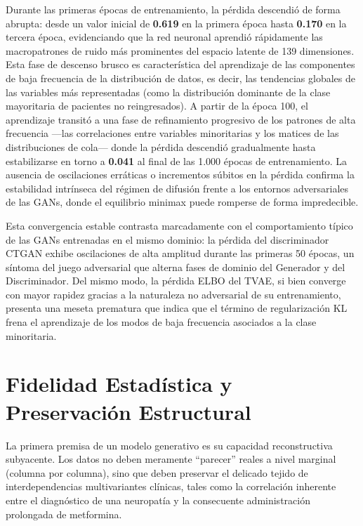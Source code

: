 Durante las primeras épocas de entrenamiento, la pérdida descendió de forma abrupta: desde un valor inicial de \textbf{0.619} en la primera época hasta \textbf{0.170} en la tercera época, evidenciando que la red neuronal aprendió rápidamente las macropatrones de ruido más prominentes del espacio latente de 139 dimensiones. Esta fase de descenso brusco es característica del aprendizaje de las componentes de baja frecuencia de la distribución de datos, es decir, las tendencias globales de las variables más representadas (como la distribución dominante de la clase mayoritaria de pacientes no reingresados). A partir de la época 100, el aprendizaje transitó a una fase de refinamiento progresivo de los patrones de alta frecuencia —las correlaciones entre variables minoritarias y los matices de las distribuciones de cola— donde la pérdida descendió gradualmente hasta estabilizarse en torno a \textbf{0.041} al final de las 1.000 épocas de entrenamiento. La ausencia de oscilaciones erráticas o incrementos súbitos en la pérdida confirma la estabilidad intrínseca del régimen de difusión frente a los entornos adversariales de las GANs, donde el equilibrio minimax puede romperse de forma impredecible.

Esta convergencia estable contrasta marcadamente con el comportamiento típico de las GANs entrenadas en el mismo dominio: la pérdida del discriminador CTGAN exhibe oscilaciones de alta amplitud durante las primeras 50 épocas, un síntoma del juego adversarial que alterna fases de dominio del Generador y del Discriminador. Del mismo modo, la pérdida ELBO del TVAE, si bien converge con mayor rapidez gracias a la naturaleza no adversarial de su entrenamiento, presenta una meseta prematura que indica que el término de regularización KL frena el aprendizaje de los modos de baja frecuencia asociados a la clase minoritaria.

\section{Fidelidad Estadística y Preservación Estructural}

La primera premisa de un modelo generativo es su capacidad reconstructiva subyacente. Los datos no deben meramente ``parecer'' reales a nivel marginal (columna por columna), sino que deben preservar el delicado tejido de interdependencias multivariantes clínicas, tales como la correlación inherente entre el diagnóstico de una neuropatía y la consecuente administración prolongada de metformina.

